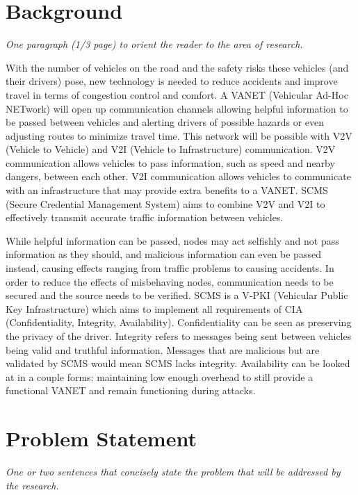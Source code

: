\documentclass {article}
\newcommand{\sechint}[1]{\small{\emph{#1}} \bigskip}
\begin{document}
\tableofcontents
\pagebreak

\section{Background}{\sechint{One paragraph (1/3 page) to orient the reader to the area of research.}}

With the number of vehicles on the road and the safety risks these vehicles (and their drivers) pose, new technology is needed to reduce accidents and improve travel in terms of congestion control and comfort. A VANET (Vehicular Ad-Hoc NETwork) will open up communication channels allowing helpful information to be passed between vehicles and alerting drivers of possible hazards or even adjusting routes to minimize travel time. This network will be possible with V2V (Vehicle to Vehicle) and V2I (Vehicle to Infrastructure) communication. V2V communication allows vehicles to pass information, such as speed and nearby dangers, between each other. V2I communication allows vehicles to communicate with an infrastructure that may provide extra benefits to a VANET. SCMS (Secure Credential Management System) aims to combine V2V and V2I to effectively transmit accurate traffic information between vehicles.

While helpful information can be passed, nodes may act selfishly and not pass information as they should, and malicious information can even be passed instead, causing effects ranging from traffic problems to causing accidents. In order to reduce the effects of misbehaving nodes, communication needs to be secured and the source needs to be verified. SCMS is a V-PKI (Vehicular Public Key Infrastructure) which aims to implement all requirements of CIA (Confidentiality, Integrity, Availability). Confidentiality can be seen as preserving the privacy of the driver. Integrity refers to messages being sent between vehicles being valid and truthful information. Messages that are malicious but are validated by SCMS would mean SCMS lacks integrity. Availability can be looked at in a couple forms: maintaining low enough overhead to still provide a functional VANET and remain functioning during attacks.

\section{Problem Statement}{\sechint{One or two sentences that concisely state the problem that will be addressed by the research.}}
\end{document}

